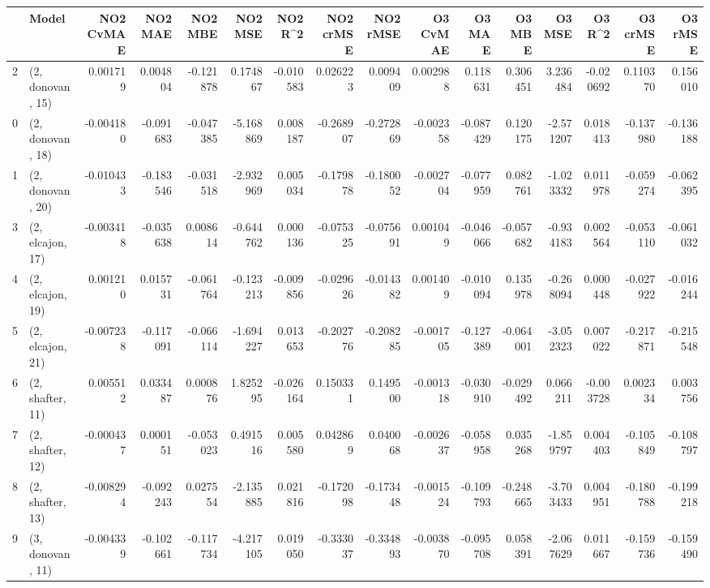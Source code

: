 \begin{tabular}{llrrrrrrrrrrrrrr}
\toprule
{} &             Model &  NO2 CvMAE &   NO2 MAE &   NO2 MBE &    NO2 MSE &   NO2 R\textasciicircum2 &  NO2 crMSE &  NO2 rMSE &  O3 CvMAE &    O3 MAE &    O3 MBE &     O3 MSE &    O3 R\textasciicircum2 &  O3 crMSE &   O3 rMSE \\
\midrule
2  &  (2, donovan, 15) &   0.001719 &  0.004804 & -0.121878 &   0.174867 & -0.010583 &   0.026223 &  0.009409 &  0.002988 &  0.118631 &  0.306451 &   3.236484 & -0.020692 &  0.110370 &  0.156010 \\
0  &  (2, donovan, 18) &  -0.004180 & -0.091683 & -0.047385 &  -5.168869 &  0.008187 &  -0.268907 & -0.272869 & -0.002358 & -0.087429 &  0.120175 &  -2.571207 &  0.018413 & -0.137980 & -0.136188 \\
1  &  (2, donovan, 20) &  -0.010433 & -0.183546 & -0.031518 &  -2.932969 &  0.005034 &  -0.179878 & -0.180052 & -0.002704 & -0.077959 &  0.082761 &  -1.023332 &  0.011978 & -0.059274 & -0.062395 \\
3  &  (2, elcajon, 17) &  -0.003418 & -0.035638 &  0.008614 &  -0.644762 &  0.000136 &  -0.075325 & -0.075691 &  0.001049 & -0.046066 & -0.057682 &  -0.934183 &  0.002564 & -0.053110 & -0.061032 \\
4  &  (2, elcajon, 19) &   0.001210 &  0.015731 & -0.061764 &  -0.123213 & -0.009856 &  -0.029626 & -0.014382 &  0.001409 & -0.010094 &  0.135978 &  -0.268094 &  0.000448 & -0.027922 & -0.016244 \\
5  &  (2, elcajon, 21) &  -0.007238 & -0.117091 & -0.066114 &  -1.694227 &  0.013653 &  -0.202776 & -0.208285 & -0.001705 & -0.127389 & -0.064001 &  -3.052323 &  0.007022 & -0.217871 & -0.215548 \\
6  &  (2, shafter, 11) &   0.005512 &  0.033487 &  0.000876 &   1.825295 & -0.026164 &   0.150331 &  0.149500 & -0.001318 & -0.030910 & -0.029492 &   0.066211 & -0.003728 &  0.002334 &  0.003756 \\
7  &  (2, shafter, 12) &  -0.000437 &  0.000151 & -0.053023 &   0.491516 &  0.005580 &   0.042869 &  0.040068 & -0.002637 & -0.058958 &  0.035268 &  -1.859797 &  0.004403 & -0.105849 & -0.108797 \\
8  &  (2, shafter, 13) &  -0.008294 & -0.092243 &  0.027554 &  -2.135885 &  0.021816 &  -0.172098 & -0.173448 & -0.001524 & -0.109793 & -0.248665 &  -3.703433 &  0.004951 & -0.180788 & -0.199218 \\
9  &  (3, donovan, 11) &  -0.004339 & -0.102661 & -0.117734 &  -4.217105 &  0.019050 &  -0.333037 & -0.334893 & -0.003870 & -0.095708 &  0.058391 &  -2.067629 &  0.011667 & -0.159736 & -0.159490 \\

\end{tabular}
